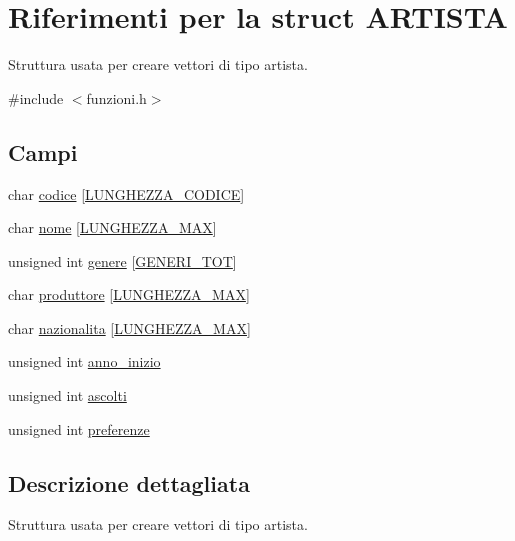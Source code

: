 \hypertarget{struct_a_r_t_i_s_t_a}{}\section{Riferimenti per la struct A\+R\+T\+I\+S\+TA}
\label{struct_a_r_t_i_s_t_a}


Struttura usata per creare vettori di tipo artista.  




{\ttfamily \#include $<$funzioni.\+h$>$}

\subsection*{Campi}
\begin{DoxyCompactItemize}
\item 
char \hyperlink{struct_a_r_t_i_s_t_a_a614effe8a3285fd1b6bd29e7bff7ff72}{codice} \mbox{[}\hyperlink{funzioni_8h_a15beac41f998f4495a79396160235665}{L\+U\+N\+G\+H\+E\+Z\+Z\+A\+\_\+\+C\+O\+D\+I\+CE}\mbox{]}
\item 
char \hyperlink{struct_a_r_t_i_s_t_a_a8ddd53b0e7cbe5f893e13b26a0203005}{nome} \mbox{[}\hyperlink{funzioni_8h_a2cdd71b92d6e869f8b094e32a6da6a62}{L\+U\+N\+G\+H\+E\+Z\+Z\+A\+\_\+\+M\+AX}\mbox{]}
\item 
unsigned int \hyperlink{struct_a_r_t_i_s_t_a_a27c2d0af7e1f8ac38c84bcfc71f87f4b}{genere} \mbox{[}\hyperlink{funzioni_8h_aadfbb01ff59a52b086b4c96f1a5e0cd2}{G\+E\+N\+E\+R\+I\+\_\+\+T\+OT}\mbox{]}
\item 
char \hyperlink{struct_a_r_t_i_s_t_a_a444c256b4120246fcbf1804377e61e32}{produttore} \mbox{[}\hyperlink{funzioni_8h_a2cdd71b92d6e869f8b094e32a6da6a62}{L\+U\+N\+G\+H\+E\+Z\+Z\+A\+\_\+\+M\+AX}\mbox{]}
\item 
char \hyperlink{struct_a_r_t_i_s_t_a_a9b2d858c8f1c17c58a15ad20eb10118e}{nazionalita} \mbox{[}\hyperlink{funzioni_8h_a2cdd71b92d6e869f8b094e32a6da6a62}{L\+U\+N\+G\+H\+E\+Z\+Z\+A\+\_\+\+M\+AX}\mbox{]}
\item 
unsigned int \hyperlink{struct_a_r_t_i_s_t_a_a776bd83463cbbd70affcbc08b7687675}{anno\+\_\+inizio}
\item 
unsigned int \hyperlink{struct_a_r_t_i_s_t_a_a94634853ac282b23729897e105865590}{ascolti}
\item 
unsigned int \hyperlink{struct_a_r_t_i_s_t_a_a864c672ed1a5c81d1daf02093e11eb05}{preferenze}
\end{DoxyCompactItemize}


\subsection{Descrizione dettagliata}
Struttura usata per creare vettori di tipo artista. 


